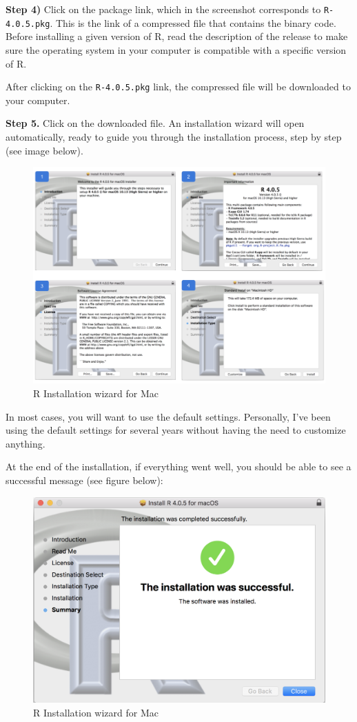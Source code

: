 \documentclass[
]{book}
\begin{document}
\textbf{Step 4)} Click on the package link, which in the screenshot corresponds to
\texttt{R-4.0.5.pkg}. This is the link of a compressed file that contains the binary
code. Before installing a given version of R, read the
description of the release to make sure the operating system in your computer
is compatible with a specific version of R.

After clicking on the \texttt{R-4.0.5.pkg} link, the compressed file will be
downloaded to your computer.

\textbf{Step 5.} Click on the downloaded file. An installation wizard will open
automatically, ready to guide you through the installation process, step by
step (see image below).

\begin{figure}

{\centering \includegraphics[width=0.9\linewidth]{images/install/R-install-steps} 

}

\caption{R Installation wizard for Mac}\label{fig:unnamed-chunk-8}
\end{figure}

In most cases, you will want to use the default settings. Personally, I've been
using the default settings for several years without having the need to
customize anything.

At the end of the installation, if everything went well, you should be able
to see a successful message (see figure below):

\begin{figure}

{\centering \includegraphics[width=0.5\linewidth]{images/install/install-5} 

}

\caption{R Installation wizard for Mac}\label{fig:unnamed-chunk-9}
\end{figure}
\end{document}
